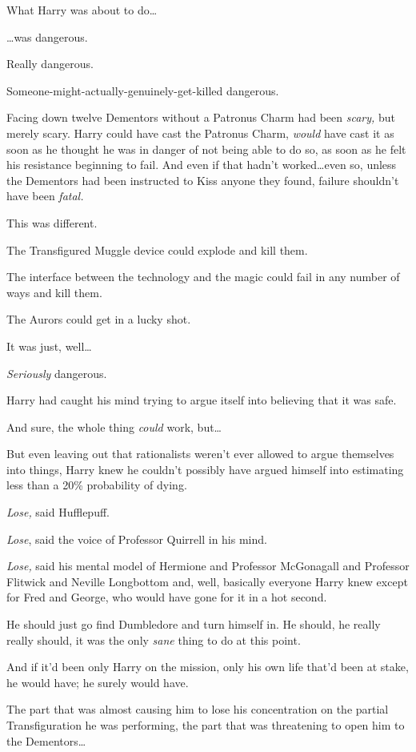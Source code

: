 What Harry was about to do…

…was dangerous.

Really dangerous.

Someone-might-actually-genuinely-get-killed dangerous.

Facing down twelve Dementors without a Patronus Charm had been \emph{scary,} but merely scary. Harry could have cast the Patronus Charm, \emph{would} have cast it as soon as he thought he was in danger of not being able to do so, as soon as he felt his resistance beginning to fail. And even if that hadn’t worked…even so, unless the Dementors had been instructed to Kiss anyone they found, failure shouldn’t have been \emph{fatal.}

This was different.

The Transfigured Muggle device could explode and kill them.

The interface between the technology and the magic could fail in any number of ways and kill them.

The Aurors could get in a lucky shot.

It was just, well…

\emph{Seriously} dangerous.

Harry had caught his mind trying to argue itself into believing that it was safe.

And sure, the whole thing \emph{could} work, but…

But even leaving out that rationalists weren’t ever allowed to argue themselves into things, Harry knew he couldn’t possibly have argued himself into estimating less than a 20\% probability of dying.

\emph{Lose,} said Hufflepuff.

\emph{Lose}, said the voice of Professor Quirrell in his mind.

\emph{Lose,} said his mental model of Hermione and Professor McGonagall and Professor Flitwick and Neville Longbottom and, well, basically everyone Harry knew except for Fred and George, who would have gone for it in a hot second.

He should just go find Dumbledore and turn himself in. He should, he really really should, it was the only \emph{sane} thing to do at this point.

And if it’d been only Harry on the mission, only his own life that’d been at stake, he would have; he surely would have.

The part that was almost causing him to lose his concentration on the partial Transfiguration he was performing, the part that was threatening to open him to the Dementors…

